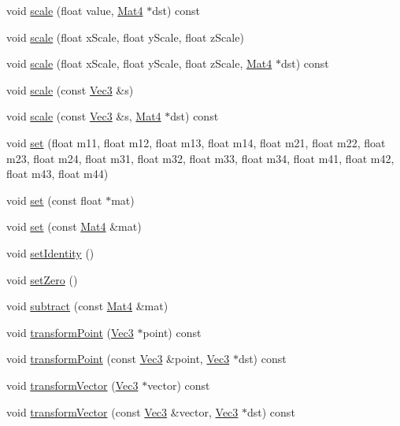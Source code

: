 \begin{DoxyCompactItemize}
void \hyperlink{classMat4_a02cadab494f29e01993f8bd137ac3c10}{scale} (float value, \hyperlink{classMat4}{Mat4} $\ast$dst) const
\item 
void \hyperlink{classMat4_a8ed91e5f5fe9c9b8a7ccccb2026dd2b9}{scale} (float x\+Scale, float y\+Scale, float z\+Scale)
\item 
void \hyperlink{classMat4_af8096eb9dc784653bfacee2561b6a654}{scale} (float x\+Scale, float y\+Scale, float z\+Scale, \hyperlink{classMat4}{Mat4} $\ast$dst) const
\item 
void \hyperlink{classMat4_a680fbd52838ca085c468dc4f559f3d04}{scale} (const \hyperlink{classVec3}{Vec3} \&s)
\item 
void \hyperlink{classMat4_aca9dcebbcb554ea36fc86ac1127a3fd4}{scale} (const \hyperlink{classVec3}{Vec3} \&s, \hyperlink{classMat4}{Mat4} $\ast$dst) const
\item 
void \hyperlink{classMat4_ac89d4d819ec41144c653dd80e4ddb6c3}{set} (float m11, float m12, float m13, float m14, float m21, float m22, float m23, float m24, float m31, float m32, float m33, float m34, float m41, float m42, float m43, float m44)
\item 
void \hyperlink{classMat4_aa41cf66bbbeaf8520730a1e119576ed3}{set} (const float $\ast$mat)
\item 
void \hyperlink{classMat4_a4673b21f6cf96fb2274be6227a877061}{set} (const \hyperlink{classMat4}{Mat4} \&mat)
\item 
void \hyperlink{classMat4_a0d20e8d7fbbc17531bb81a1446b85c98}{set\+Identity} ()
\item 
void \hyperlink{classMat4_a252b7afb2cfcd5e814fa2d3118d05de3}{set\+Zero} ()
\item 
void \hyperlink{classMat4_a3ad911389ec778e8f67aaced32be9193}{subtract} (const \hyperlink{classMat4}{Mat4} \&mat)
\item 
void \hyperlink{classMat4_a70e0d4c59e366d1c51cf6c086ec8fb58}{transform\+Point} (\hyperlink{classVec3}{Vec3} $\ast$point) const
\item 
void \hyperlink{classMat4_af85f1c69ea4ca7632d541fb12d3b23a5}{transform\+Point} (const \hyperlink{classVec3}{Vec3} \&point, \hyperlink{classVec3}{Vec3} $\ast$dst) const
\item 
void \hyperlink{classMat4_a2f5efde7152fb9e50d1e8fd45e7012bb}{transform\+Vector} (\hyperlink{classVec3}{Vec3} $\ast$vector) const
\item 
void \hyperlink{classMat4_ae115470538b721dfd6dda37b4d487805}{transform\+Vector} (const \hyperlink{classVec3}{Vec3} \&vector, \hyperlink{classVec3}{Vec3} $\ast$dst) const

\end{DoxyCompactItemize}
